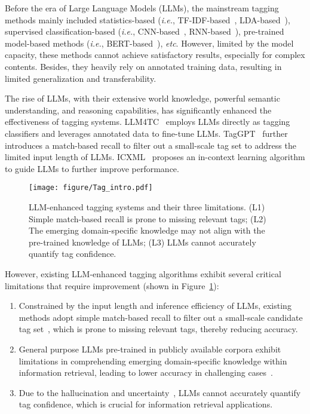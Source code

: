 Before the era of Large Language Models (LLMs), the mainstream tagging methods mainly included statistics-based (\textit{i.e.}, TF-IDF-based~\cite{qaiser2018text}, LDA-based~\cite{diaz2010lda}), supervised classification-based (\textit{i.e.}, CNN-based~\cite{zhang2015sensitivity,elnagar2019automatic}, RNN-based~\cite{liu2016recurrent,wang2015unified}), pre-trained model-based methods (\textit{i.e.}, BERT-based~\cite{hasegawa2021bert,bge,ozan2021auto}), 
\textit{etc}.
However, limited by the model capacity, these methods cannot achieve satisfactory results, especially for complex contents. Besides, they heavily rely on annotated training data, resulting in limited generalization and transferability.

The rise of LLMs, with their extensive world knowledge, powerful semantic understanding, and reasoning capabilities, has significantly enhanced the effectiveness of tagging systems. 
LLM4TC~\cite{chae2023large} employs LLMs directly as tagging classifiers and leverages annotated data to fine-tune LLMs. TagGPT~\cite{li2023taggpt} further introduces a match-based recall to filter out a small-scale tag set to address the limited input length of LLMs. ICXML~\cite{zhu2023icxml} proposes an in-context learning algorithm to guide LLMs to further improve performance.

\begin{figure}[h]
\centering
\texttt{[image: figure/Tag\_intro.pdf]}
\caption{LLM-enhanced tagging systems and their three limitations. (L1) Simple match-based recall is prone to missing relevant tags; (L2) The emerging domain-specific knowledge may not align with the pre-trained knowledge of LLMs; (L3) LLMs cannot accurately quantify tag confidence.}
\label{fig:tag_intro}
\end{figure}


However, existing LLM-enhanced tagging algorithms exhibit several critical limitations that require improvement (shown in Figure~\ref{fig:tag_intro}):
\begin{enumerate}[label=(L\arabic*),leftmargin=22pt]
    \item Constrained by the input length and inference efficiency of LLMs, existing methods adopt simple match-based recall to filter out a small-scale candidate tag set~\cite{li2023taggpt,zhu2023icxml}, which is prone to missing relevant tags, thereby reducing accuracy.
    \item General purpose LLMs pre-trained in publicly available corpora exhibit limitations in comprehending emerging domain-specific knowledge within information retrieval, leading to lower accuracy in challenging cases~\cite{chae2023large,li2024ecomgpt}.
    \item Due to the hallucination and uncertainty~\cite{ji2023survey,huang2023look}, LLMs cannot accurately quantify tag confidence, which is crucial for information retrieval applications.
\end{enumerate}



